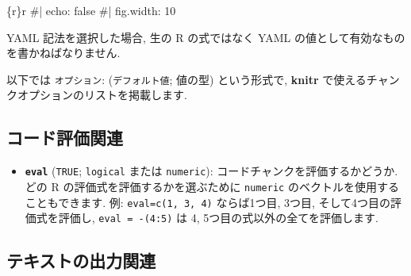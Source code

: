 \documentclass[
  lualatex,ja=standard,jafont=noto-otf]{bxjsreport}
\newenvironment{Shaded}{\begin{snugshade}}{\end{snugshade}}
\newcommand{\NormalTok}[1]{#1}
\providecommand{\tightlist}{%
  \setlength{\itemsep}{0pt}\setlength{\parskip}{0pt}}
\begin{document}
\begin{Shaded}
\begin{Highlighting}[numbers=left,,]
\NormalTok{\textasciigrave{}\textasciigrave{}\textasciigrave{}\{r\}\textasciigrave{}r \textquotesingle{}\textquotesingle{}\textasciigrave{}}
\NormalTok{\#| echo: false}
\NormalTok{\#| fig.width: 10}
\NormalTok{\textasciigrave{}\textasciigrave{}\textasciigrave{}}
\end{Highlighting}
\end{Shaded}

YAML 記法を選択した場合, 生の R の式ではなく YAML
の値として有効なものを書かねばなりません.

以下では \texttt{オプション}: (\texttt{デフォルト値}; 値の型)
という形式で, \textbf{knitr}
で使えるチャンクオプションのリストを掲載します.

\hypertarget{evaluate}{%
\subsection{コード評価関連}\label{evaluate}}

\begin{itemize}
\tightlist
\item
  \textbf{\texttt{eval}} (\texttt{TRUE}; \texttt{logical} または
  \texttt{numeric}): コードチャンクを評価するかどうか. どの R
  の評価式を評価するかを選ぶために \texttt{numeric}
  のベクトルを使用することもできます. 例: \texttt{eval=c(1,\ 3,\ 4)}
  ならば1つ目, 3つ目, そして4つ目の評価式を評価し,
  \texttt{eval\ =\ -(4:5)} は 4, 5つ目の式以外の全てを評価します.
\end{itemize}

\hypertarget{text-output}{%
\subsection{テキストの出力関連}\label{text-output}}
\end{document}
